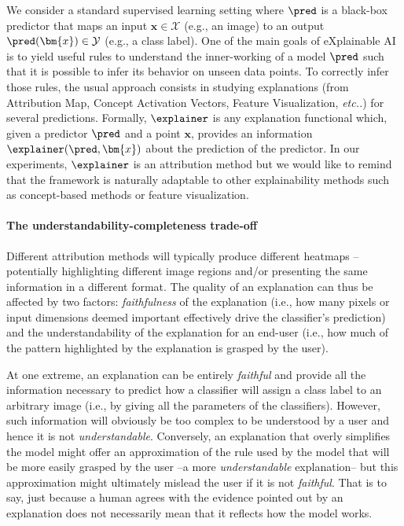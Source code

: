 \label{sec:metapred:framework}


We consider a standard supervised learning setting where $\pred$ is a black-box predictor that maps an input $\bm{x} \in \mathcal{X}$ (e.g., an image) to an output $\pred(\bm{x}) \in \mathcal{Y}$ (e.g., a class label).
One of the main goals of eXplainable AI is to yield useful rules to understand the inner-working of a model $\pred$ such that it is possible to infer its behavior on unseen data points.
To correctly infer those rules, the usual approach consists in studying explanations (from Attribution Map, Concept Activation Vectors, Feature Visualization, \textit{etc..}) for several predictions.
Formally, $\method$ is any explanation functional which, given a predictor $\pred$ and a point $\bm{x}$, provides an information $\method(\pred, \bm{x})$ about the prediction of the predictor. In our experiments, $\method$ is an attribution method but we would like to remind that the framework is naturally adaptable to other explainability methods such as concept-based methods or feature visualization.

\paragraph{The understandability-completeness trade-off} 

Different attribution methods will typically produce different heatmaps -- potentially highlighting different image regions and/or presenting the same information in a different format. The quality of an explanation can thus be affected by two factors:  {\em faithfulness} of the explanation (i.e., how many pixels or input dimensions deemed important effectively drive the classifier's prediction) and the understandability of the explanation for an end-user (i.e., how much of the pattern highlighted by the explanation is grasped by the user).


At one extreme, an explanation can be entirely {\em faithful} and provide all the information necessary to predict how a classifier will assign a class label to an arbitrary image (i.e., by giving all the parameters of the classifiers). However, such information will obviously be too complex to be understood by a user and hence it is not {\em understandable}. 
Conversely, an explanation that overly simplifies the model might offer an approximation of the rule used by the model that will be more easily grasped by the user --a more {\em understandable} explanation-- but this approximation might ultimately mislead the user if it is not {\em faithful}. That is to say, just because a human agrees with the evidence pointed out by an explanation does not necessarily mean that it reflects how the model works.


